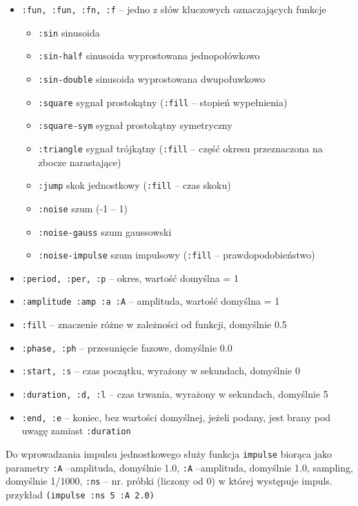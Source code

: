 \documentclass[12pt]{article}
\newcommand{\cljt}[1]{\texttt{#1}}
\begin{document}
\begin{itemize}
	\item \cljt{:fun, :fun, :fn, :f} -- jedno z słów kluczowych oznaczających funkcje
	      \begin{itemize}
		      \item \cljt{:sin} sinusoida
		      \item \cljt{:sin-half} sinusoida wyprostowana jednopołówkowo
		      \item \cljt{:sin-double} sinusoida wyprostowana dwupołuwkowo
		      \item \cljt{:square} sygnał prostokątny (\cljt{:fill} -- stopień wypełnienia)
		      \item \cljt{:square-sym} sygnał prostokątny symetryczny
		      \item \cljt{:triangle} sygnał trójkątny (\cljt{:fill} -- część okresu przeznaczona na zbocze narastające)
		      \item \cljt{:jump} skok jednostkowy (\cljt{:fill} -- czas skoku)
		      \item \cljt{:noise} szum (-1 -- 1)
		      \item \cljt{:noise-gauss} szum gaussowski
		      \item \cljt{:noise-impulse} szum impulsowy (\cljt{:fill} -- prawdopodobieństwo)
	      \end{itemize}
	\item \cljt{:period, :per, :p} -- okres, wartość domyślna = 1
	\item \cljt{:amplitude :amp :a :A} -- amplituda, wartość domyślna = 1
	\item \cljt{:fill} -- znaczenie różne w zależności od funkcji, domyślnie 0.5

	\item \cljt{:phase, :ph} -- przesunięcie fazowe, domyślnie 0.0

	\item \cljt{:start, :s} -- czas początku, wyrażony w sekundach, domyślnie 0
	\item \cljt{:duration, :d, :l} -- czas trwania, wyrażony w sekundach, domyślnie 5
	\item \cljt{:end, :e} -- koniec, bez wartości domyślnej, jeżeli podany, jest brany pod uwagę zamiast \cljt{:duration}
\end{itemize}
Do wprowadzania impulsu jednostkowego służy funkcja \cljt{impulse} biorąca jako parametry \cljt{:A} --amplituda, domyślnie 1.0, \cljt{:A} --amplituda, domyślnie 1.0, sampling, domyślnie 1/1000,  \cljt{:ns} -- nr. próbki (liczony od 0) w której występuje impuls. przykład \cljt{(impulse :ns 5 :A 2.0)}
\end{document}
